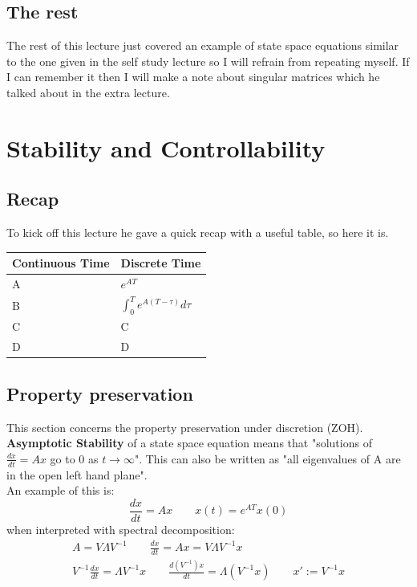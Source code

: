 \documentclass[a4paper,11pt]{article}
\begin{document}
\subsection{The rest}
 The rest of this lecture just covered an example of state space equations similar to the one given in the self study lecture so I will refrain from repeating myself. If I can remember it then I will make a note about singular matrices which he talked about in the extra lecture.                                                                                                                             
\section{Stability and Controllability}
\subsection{Recap}
To kick off this lecture he gave a quick recap with a useful table, so here it is.
\begin{table}[htp!]
\centering
\begin{tabular}{l|l}
Continuous Time & Discrete Time \\ \hline 
A               & $e^{AT}$ \\
B               & $\int^{T}_{0}e^{A(T-\tau)}d\tau$ \\
C               & C \\
D               & D
\end{tabular}
\end{table}
\subsection{Property preservation}
	This section concerns the property preservation under discretion (ZOH).\\
	\textbf{Asymptotic Stability} of a state space equation means that "solutions of $\frac{dx}{dt}=Ax$ go to 0 as $t \rightarrow \infty$". This can also be written as "all eigenvalues of A are in the open left hand plane".\\
	An example of this is:
	\begin{equation}
		\frac{dx}{dt}= A x \qquad x(t) = e^{A T}x(0)
	\end{equation}
	when interpreted with spectral decomposition:
	\begin{gather}
		A=V\Lambda V^{-1} \qquad \frac{dx}{dt}= A x = V\Lambda V^{-1}x\\
		V^{-1}\frac{dx}{dt} = \Lambda V^{-1}x \qquad \frac{d(V^{-1})x}{dt} = \Lambda (V^{-1}x) \qquad x' := V^{-1}x
	\end{gather}
\end{document}
